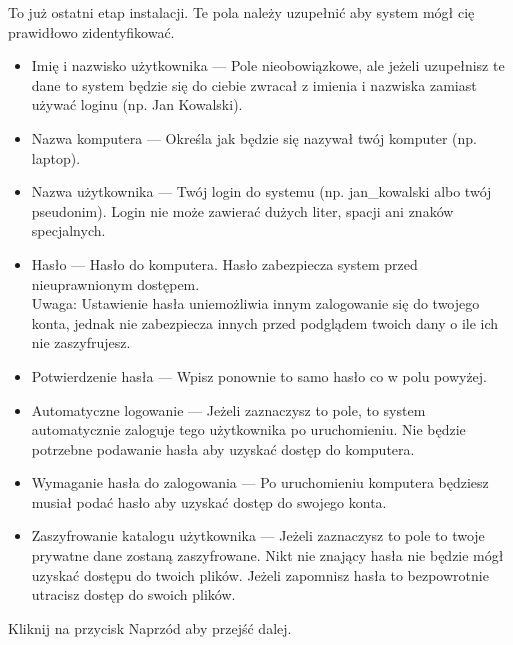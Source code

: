 To już ostatni etap instalacji. Te pola należy uzupełnić aby system mógł cię prawidłowo zidentyfikować.
\begin{itemize}
\item \textcolor{ubuntu_orange}{Imię i nazwisko użytkownika} --- Pole nieobowiązkowe, ale jeżeli uzupełnisz te dane to system będzie się do ciebie zwracał z imienia i nazwiska zamiast używać loginu (np. Jan Kowalski).
\item \textcolor{ubuntu_orange}{Nazwa komputera} --- Określa jak będzie się nazywał twój komputer (np. laptop).
\item \textcolor{ubuntu_orange}{Nazwa użytkownika} --- Twój login do systemu (np. jan\_kowalski albo twój pseudonim). Login nie może zawierać dużych liter, spacji ani znaków specjalnych.
\item \textcolor{ubuntu_orange}{Hasło} --- Hasło do komputera. Hasło zabezpiecza system przed nieuprawnionym dostępem.\\
Uwaga: Ustawienie hasła uniemożliwia innym zalogowanie się do twojego konta, jednak nie zabezpiecza innych przed podglądem twoich dany o ile ich nie zaszyfrujesz. 
\item \textcolor{ubuntu_orange}{Potwierdzenie hasła} --- Wpisz ponownie to samo hasło co w polu powyżej.
\item \textcolor{ubuntu_orange}{Automatyczne logowanie} --- Jeżeli zaznaczysz to pole, to system automatycznie zaloguje tego użytkownika po uruchomieniu. Nie będzie potrzebne podawanie hasła aby uzyskać dostęp do komputera.
\item \textcolor{ubuntu_orange}{Wymaganie hasła do zalogowania} --- Po uruchomieniu komputera będziesz musiał podać hasło aby uzyskać dostęp do swojego konta.
\item \textcolor{ubuntu_orange}{Zaszyfrowanie katalogu użytkownika} --- Jeżeli zaznaczysz to pole to twoje prywatne dane zostaną zaszyfrowane. Nikt nie znający hasła nie będzie mógł uzyskać dostępu do twoich plików. Jeżeli zapomnisz hasła to bezpowrotnie utracisz dostęp do swoich plików.
\end{itemize}
\begin{flushright}
Kliknij na przycisk \textcolor{ubuntu_orange}{Naprzód} aby przejść dalej.
\end{flushright}
\clearpage
